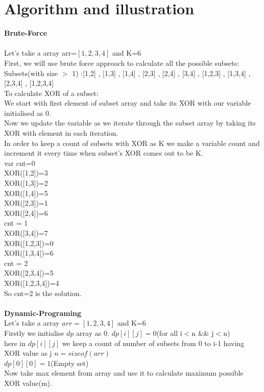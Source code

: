 \documentclass[conference]{IEEEtran}
\begin{document}
\section{Algorithm and illustration}
\textbf{Brute-Force}\\\\
Let's take a array arr=$[1,2,3,4]$ and K=6\\
First, we will use brute force approach to calculate all the possible subsets:\\
Subsets(with size $>$ 1) :[1,2]  ,  [1,3]  ,  [1,4]  ,  [2,3]  ,  [2,4]  ,  [3,4] , [1,2,3] , [1,3,4] , [2,3,4] , [1,2,3,4]\\
To calculate XOR of a subset:\\
We start with first element of subset array and take its XOR with our variable initialised as 0.\\
Now we update the variable as we iterate through the subset array by taking its XOR with element in each iteration.\\
In order to keep a count of subsets with XOR as K we make a variable count and increment it every time when subset's XOR comes out to be K.\\
var cnt=0\\
XOR([1,2])=3\\
XOR([1,3])=2\\
XOR([1,4])=5\\
XOR([2,3])=1\\
XOR([2,4])=6\\
cnt = 1\\
XOR([3,4])=7\\
XOR([1,2,3])=0\\
XOR([1,3,4])=6\\
cnt = 2\\
XOR([2,3,4])=5\\
XOR([1,2,3,4])=4\\
So cnt=2 is the solution.
\\ \\
\textbf{Dynamic-Programing}\\
Let's take a array $arr=[1,2,3,4]$ and K=6\\
Firstly we initialise $dp$ array as 0.
$dp[i][j]=0$(for all i$<$n \&\& j$<$n)\\
here in $dp[i][j]$ we keep a count of number of subsets  from  0  to  i-1  having  XOR  value  as  j
$n= sizeof(arr)$\\
$dp[0][0]=1 $(Empty set)\\
Now take max element from array and use it to calculate maximum possible XOR value(m).\\
\end{document}
